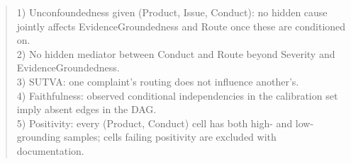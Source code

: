 \begin{quote}\small
1) Unconfoundedness given (Product, Issue, Conduct): no hidden cause jointly affects EvidenceGroundedness and Route once these are conditioned on.\\
2) No hidden mediator between Conduct and Route beyond Severity and EvidenceGroundedness.\\
3) SUTVA: one complaint's routing does not influence another's.\\
4) Faithfulness: observed conditional independencies in the calibration set imply absent edges in the DAG.\\
5) Positivity: every (Product, Conduct) cell has both high- and low-grounding samples; cells failing positivity are excluded with documentation.
\end{quote}